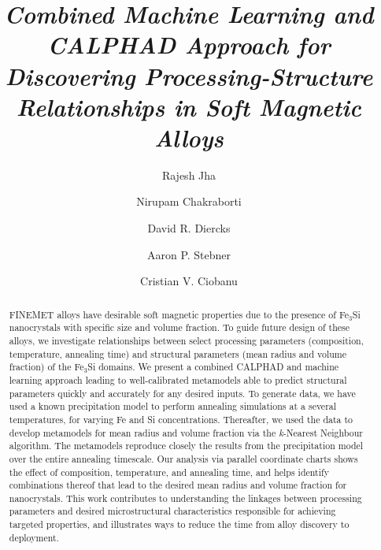 \begin{frontmatter}
\title{\textit{Combined Machine Learning and CALPHAD Approach for Discovering Processing-Structure Relationships in Soft Magnetic Alloys} }%



\author[label1]{Rajesh Jha}
\author[label2]{Nirupam Chakraborti}
\author[label3]{David R. Diercks}
\author[label1]{Aaron P. Stebner}
\author[label1]{Cristian V. Ciobanu}

\address[label1]{Department of Mechanical Engineering, Colorado School of Mines, Golden, Colorado 80401, USA}
\address[label2]{Department of Metallurgical and Materials Engineering, Indian Institute of Technology Kharagpur, West Bengal, India}
\address[label3]{Department of Metallurgical and Materials Engineering, Colorado School of Mines, Golden, Colorado 80401, USA}

\begin{abstract}
FINEMET alloys have desirable soft magnetic properties due to the presence of
Fe$_3$Si nanocrystals with specific size and volume fraction. To guide future design of these alloys, we
investigate relationships between select processing parameters (composition, temperature, annealing time) and
structural parameters (mean radius and volume fraction)
of the Fe$_3$Si domains.
We present a combined CALPHAD and machine learning approach leading to well-calibrated metamodels able to predict structural parameters quickly and accurately for any desired inputs. To generate data, we have used a known precipitation model to
perform annealing simulations at a several temperatures, for
varying Fe and Si concentrations. Thereafter, we used the data to develop metamodels
for mean radius and volume fraction via the \emph{k}-Nearest Neighbour algorithm.
The metamodels reproduce closely the results from the precipitation  model over the entire annealing timescale. Our analysis via parallel coordinate charts shows the effect of composition, temperature, and annealing time, and helps
identify combinations thereof that lead to the desired mean radius and volume fraction for nanocrystals.
This work contributes to understanding the linkages between processing parameters and
desired microstructural characteristics responsible for achieving targeted properties, and illustrates ways to reduce the time from alloy discovery to deployment.
\end{abstract}


\end{frontmatter}
